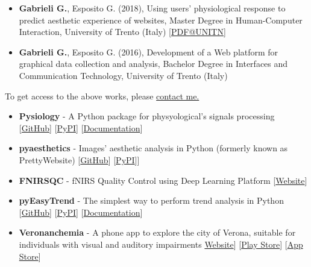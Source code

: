 \documentclass[10pt,a4paper]{altacv}
\begin{document}
\begin{fullwidth}
\begin{itemize}
			\item \textbf{Gabrieli G.}, Esposito G. (2018), Using users' physiological response to predict aesthetic experience of websites, Master Degree in Human-Computer Interaction, University of Trento (Italy) [\href{http://www5.unitn.it/Biblioteca/it/Web/RichiestaConsultazioneTesi/364090}{PDF@UNITN}]
			
			\item \textbf{Gabrieli G.}, Esposito G. (2016), Development of a Web platform for graphical data collection and analysis, Bachelor Degree in Interfaces and Communication Technology, University of Trento (Italy) 
		\end{itemize}
		
		To get access to the above works, please \href{mailto:gack94@gmail.com}{contact me.}
		
		\begin{itemize}
			\item \textbf{Pysiology} - A Python package for physyological's signals processing  [\href{https://github.com/Gabrock94/Pysiology}{GitHub}] [\href{https://pypi.org/project/pysiology/}{PyPI}] [\href{https://pysiology.rtfd.io}{Documentation}] 
			
			\item \textbf{pyaesthetics} -  Images' aesthetic analysis in Python (formerly known as PrettyWebsite)  [\href{https://github.com/Gabrock94/pyaesthetics}{GitHub}] [\href{https://pypi.org/project/pyaesthetics/}{PyPI}]] 
			
			\item \textbf{FNIRSQC} -  fNIRS Quality Control using Deep Learning Platform  [\href{https://socialaffectiveneuroscience.com/fnirsqc/}{Website}]
			
			\item \textbf{pyEasyTrend} - The simplest way to perform trend analysis in Python [\href{https://github.com/Gabrock94/pyEasyTrend}{GitHub}] [\href{https://pypi.org/project/pyEasyTrend/}{PyPI}] [\href{https://pyeasytrend.readthedocs.io}{Documentation}] 
			
			
			\item \textbf{Veronanchemia} - A  phone app to explore the city of Verona, suitable for individuals with visual and auditory impairments \href{https://www.veronanchemia.it/}{Website}] [\href{https://play.google.com/store/apps/details?id=com.giuliogabrieli.verona_anche_mia}{Play Store}] [\href{https://apps.apple.com/app/id1645680408}{App Store}] 
			

\end{itemize}
\end{fullwidth}
\end{document}
